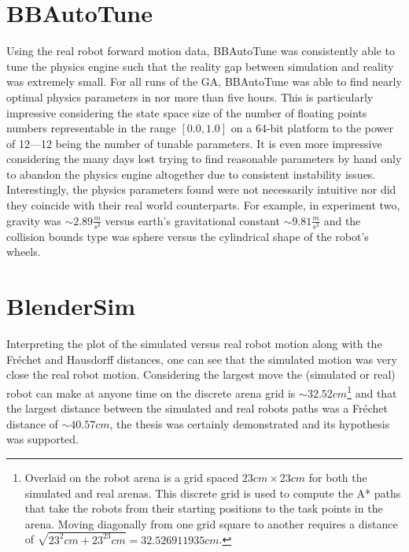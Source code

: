 \section{BBAutoTune}

Using the real robot forward motion data, BBAutoTune was consistently able to tune the physics engine such that the reality gap between simulation and reality was extremely small. For all runs of the GA, BBAutoTune was able to find nearly optimal physics parameters in nor more than five hours. This is particularly impressive considering the state space size of the number of floating points numbers representable in the range $[0.0,1.0]$ on a 64-bit platform to the power of 12---12 being the number of tunable parameters. It is even more impressive considering the many days lost trying to find reasonable parameters by hand only to abandon the physics engine altogether due to consistent instability issues. Interestingly, the physics parameters found were not necessarily intuitive nor did they coincide with their real world counterparts. For example, in experiment two, gravity was $\sim2.89\frac{m}{s^2}$ versus earth's gravitational constant $\sim9.81\frac{m}{s^2}$ and the collision bounds type was sphere versus the cylindrical shape of the robot's wheels.   

\section{BlenderSim}

Interpreting the plot of the simulated versus real robot motion along with the Fr{\'e}chet and Hausdorff distances, one can see that the simulated motion was very close the real robot motion. Considering the largest move the (simulated or real) robot can make at anyone time on the discrete arena grid is $\sim32.52cm$\footnote{Overlaid on the robot arena is a grid spaced $23cm\times23cm$ for both the simulated and real arenas. This discrete grid is used to compute the A* paths that take the robots from their starting positions to the task points in the arena. Moving diagonally from one grid square to another requires a distance of $\sqrt{23^2cm+23^23cm}=32.526911935cm$.} and that the largest distance between the simulated and real robots paths was a Fr{\'e}chet distance of $\sim40.57cm$, the thesis was certainly demonstrated and its hypothesis was supported.  
